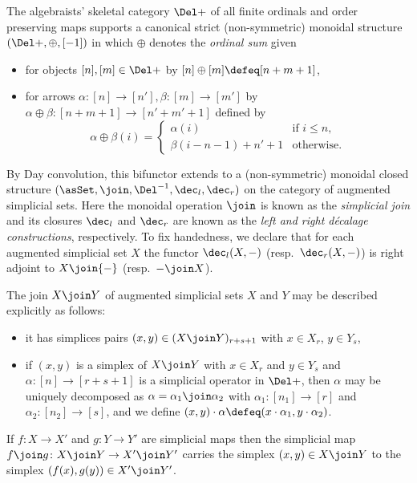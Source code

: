   \begin{defn}\label{defn:join-dec} The algebraists' skeletal category $\Del+$ of all finite ordinals and order preserving maps supports a canonical strict (non-symmetric) monoidal structure $(\Del+,\oplus,[-1])$ in which $\oplus$ denotes the {\em ordinal sum\/} given 
  \begin{itemize}
    \item for objects $[n],[m]\in\Del+$ by $[n]\oplus[m] \defeq [n+m+1]$,
    \item for arrows $\alpha\colon[n]\to[n'], \beta\colon[m]\to[m']$ by $\alpha\oplus\beta\colon[n+m+1]\to[n'+m'+1]$ defined by
  \begin{equation*}
    \alpha\oplus\beta(i) =
    \begin{cases}
    \alpha(i)& \text{if $i\leq n$,} \\
    \beta(i-n-1) + n' + 1& \text{otherwise.}
    \end{cases}
  \end{equation*}
  \end{itemize}
By Day convolution, this bifunctor extends to a (non-symmetric) monoidal closed structure $(\asSet, \join, \Del^{-1}, \dec_l, \dec_r)$ on the category of augmented simplicial sets. Here the monoidal operation $\join$ is known as the {\em simplicial join\/} and its closures $\dec_l$ and $\dec_r$ are known as the {\em left and right d{\'e}calage constructions}, respectively.   To fix handedness, we declare that for each augmented simplicial set $X$ the functor $\dec_l(X,{-})$ (resp.\ $\dec_r(X,{-})$) is right adjoint to $X\join{-}$ (resp.\ ${-}\join X$).

The join $X\join Y$ of augmented simplicial sets $X$ and $Y$ may be described explicitly as follows:
  \begin{itemize}
    \item it has simplices pairs $(x,y) \in (X\join Y)_{r+s+1}$ with $x\in X_r$, $y\in Y_s$,
    \item if $(x,y)$ is a simplex of $X\join Y$ with $x \in X_r$ and $y \in Y_s$ and $\alpha\colon[n]\to[r+s+1]$ is a simplicial operator in $\Del+$, then $\alpha$ may be uniquely decomposed as $\alpha=\alpha_1\join\alpha_2$ with $\alpha_1\colon[n_1]\to[r]$ and $\alpha_2\colon[n_2]\to[s]$, and we define $(x,y)\cdot\alpha\defeq (x\cdot\alpha_1,y\cdot\alpha_2)$. 
  \end{itemize}
If $f\colon X\to X'$ and $g\colon Y\to Y'$ are simplicial maps then the simplicial map $f\join g\colon X\join Y\to X'\join Y'$  carries the simplex $(x,y)\in X\join Y$ to the simplex $(f(x),g(y))\in X'\join Y'$. 
  \end{defn}

